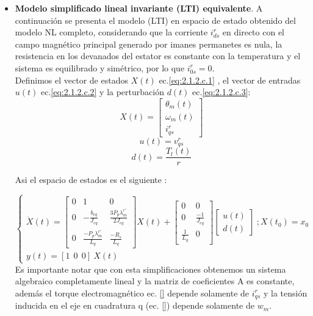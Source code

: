\documentclass[10pt]{article}
\begin{document}
\begin{enumerate}
\begin{itemize}
	\item\textbf{ Modelo simplificado lineal invariante (LTI) equivalente}.
	A continuación se presenta el modelo (LTI) en espacio de estado obtenido del modelo NL completo, considerando que la corriente  		$i^{r}_{ds}$ en directo con el campo magnético principal generado por imanes permanetes es nula, la resistencia en los 			devanados del estator es constante con la temperatura y el sistema es equilibrado y simétrico, por lo que  $i^{r}_{0s}=0$.\\
	Definimos el vector de estados $X(t)$ ec.\ref{eq:2.1.2.c.1} , el vector de entradas $u(t)$ ec.\ref{eq:2.1.2.c.2} y la perturbación 	$d(t)$ ec.\ref{eq:2.1.2.c.3}:
	\begin{equation}
		X(t)=\begin{bmatrix}
			\theta_{m}(t)\\
			\omega_{m}(t) 
			\\ 
			i^{r}_{qs}
		\end{bmatrix}
		\label{eq:2.1.2.c.1}
	\end{equation}
	\begin{equation}
		u(t)=v^{r}_{qs} 
		\label{eq:2.1.2.c.2}
	\end{equation}
	\begin{equation}
		d(t)=\frac{T_{l}(t)}{r} 
		\label{eq:2.1.2.c.3}
	\end{equation}
	
	Asi el espacio de estados es el siguiente  :
	
	\begin{equation}
	\begin{cases}
	\dot{X}(t)=\begin{bmatrix}
	0 & 1 &0 \\ 
	0 & -\frac{b_{eq}}{J_{eq}} & \frac{3 P_{p} \lambda^{r'}_{m}}{2 J_{eq}} \\ 
	0  & \frac{- P_{p} \lambda^{r'}_{m}}{ L_{q}} & \frac{-R_{s}}{L_{q}}
	\end{bmatrix} X(t) + \begin{bmatrix}
	0 &0 \\ 
	0 &\frac{-1}{J_{eq}} \\ 
	 \frac{1}{L_{q}}&0 
	\end{bmatrix} \begin{bmatrix}
	u(t)\\
	d(t) 
	
	\end{bmatrix} \ ; X(t_{0})=x_{0}\\ 
	y(t)=[1 \ \ 0 \ \ 0 ] \ X(t)
	\end{cases}
	\label{eq:2.1.2.c.4}
	\end{equation}
	Es importante notar que con esta simplificaciones obtenemos un sistema algebraico completamente lineal y la matriz de 				coeficientes A es constante, además el torque electromagnético ec. \ref{} depende solamente de $i^{r}_{qs}$ y la tensión 			inducida en el eje en cuadratura q (ec. \ref{}) depende solamente de $w_{m}$.
	

\end{itemize}
\end{enumerate}
\end{document}

